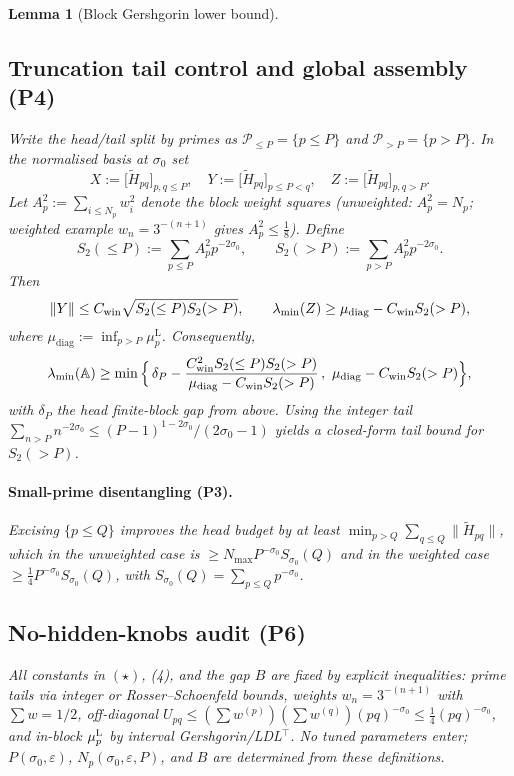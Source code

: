 \documentclass[11pt]{article}
\newtheorem{lemma}{Lemma}[section]
\theoremstyle{definition}
\theoremstyle{remark}
\begin{document}
\begin{lemma}[Block Gershgorin lower bound]
\vspace{1.0cm}
\subsection*{Truncation tail control and global assembly (P4)}
Write the head/tail split by primes as $\mathcal P_{\le P}=\{p\le P\}$ and $\mathcal P_{>P}=\{p>P\}$. In the normalised basis at $\sigma_0$ set
\[ X:=\bigl[\widetilde H_{pq}\bigr]_{p,q\le P},\quad Y:=\bigl[\widetilde H_{pq}\bigr]_{p\le P<q},\quad Z:=\bigl[\widetilde H_{pq}\bigr]_{p,q>P}. \]
Let $A_p^2:=\sum_{i\le N_p} w_i^2$ denote the block weight squares (unweighted: $A_p^2=N_p$; weighted example $w_n=3^{-(n+1)}$ gives $A_p^2\le\tfrac18$). Define
\[ S_2(\le P):=\sum_{p\le P} A_p^2 p^{-2\sigma_0},\qquad S_2(>P):=\sum_{p>P} A_p^2 p^{-2\sigma_0}. \]
Then
\[ \|Y\|\le C_{\rm win}\sqrt{S_2(\le P)S_2(>P)},\qquad \lambda_{\min}(Z)\ge \mu_{\mathrm{diag}}-C_{\rm win}S_2(>P), \]
where $\mu_{\mathrm{diag}}:=\inf_{p>P}\mu_p^{\mathrm L}$. Consequently,
\[ \lambda_{\min}(\mathbb A)\ge \min\Big\{\,\delta_P - \dfrac{C_{\rm win}^2 S_2(\le P)S_2(>P)}{\mu_{\mathrm{diag}}-C_{\rm win}S_2(>P)}\,,\ \mu_{\mathrm{diag}}-C_{\rm win}S_2(>P)\Big\}, \]
with $\delta_P$ the head finite-block gap from above. Using the integer tail $\sum_{n>P}n^{-2\sigma_0}\le (P-1)^{1-2\sigma_0}/(2\sigma_0-1)$ yields a closed-form tail bound for $S_2(>P)$.





\vspace{1.0cm}
\paragraph{Small-prime disentangling (P3).}
Excising $\{p\le Q\}$ improves the head budget by at least $\min_{p>Q}\sum_{q\le Q}\|\widetilde H_{pq}\|$, which in the unweighted case is $\ge N_{\max} P^{-\sigma_0} S_{\sigma_0}(Q)$ and in the weighted case $\ge \tfrac14 P^{-\sigma_0} S_{\sigma_0}(Q)$, with $S_{\sigma_0}(Q)=\sum_{p\le Q}p^{-\sigma_0}$.





\vspace{1.0cm}
\subsection*{No-hidden-knobs audit (P6)}
All constants in $(\star)$, (4), and the gap $B$ are fixed by explicit inequalities: prime tails via integer or Rosser--Schoenfeld bounds, weights $w_n=3^{-(n+1)}$ with $\sum w=1/2$, off-diagonal $U_{pq}\le (\sum w^{(p)})(\sum w^{(q)})(pq)^{-\sigma_0}\le \tfrac14 (pq)^{-\sigma_0}$, and in-block $\mu_p^{\rm L}$ by interval Gershgorin/LDL$^\top$. No tuned parameters enter; $P(\sigma_0,\varepsilon)$, $N_p(\sigma_0,\varepsilon,P)$, and $B$ are determined from these definitions.



\end{lemma}
\end{document}
